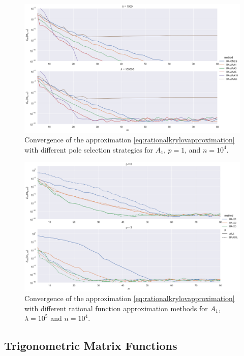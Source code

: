 \begin{figure}[h]
    \centering
    \includegraphics[width=.9\textwidth]{img/AAA/cnvg_poles_n10000_eigs.png}
    \caption{
        Convergence of the approximation \eqref{eq:rationalkrylovapproximation} with different
        pole selection strategies for $A_1$, $p=1$, and $n=10^4$.
    }
    \label{fig:rationalkrylovpoleselection}
\end{figure}

\begin{figure}[h]
    \centering
    \includegraphics[width=.9\textwidth]{img/AAA/cnvg_poles_n10000_eigs_BRASIL.png}
    \caption{
        Convergence of the approximation \eqref{eq:rationalkrylovapproximation} with different
        rational function approximation methods for $A_1$, $\lambda = 10^5$ and $n=10^4$.
    }
    \label{fig:rationalkrylovpoleselectionbrasil}
\end{figure}

\FloatBarrier
\subsection{Trigonometric Matrix Functions}
